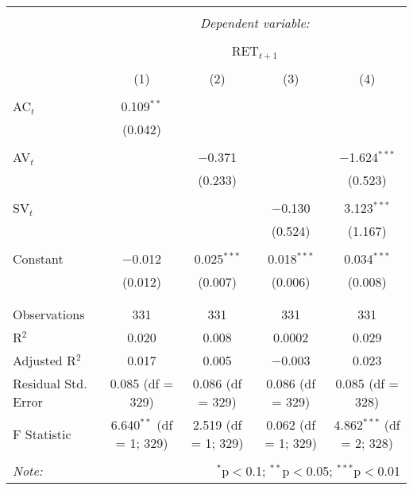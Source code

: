 
\begin{table}[!htbp] \centering 
  \caption{} 
  \label{} 
\begin{tabular}{@{\extracolsep{5pt}}lcccc} 
\\[-1.8ex]\hline 
\hline \\[-1.8ex] 
 & \multicolumn{4}{c}{\textit{Dependent variable:}} \\ 
\cline{2-5} 
\\[-1.8ex] & \multicolumn{4}{c}{RET$_{t+1}$} \\ 
\\[-1.8ex] & (1) & (2) & (3) & (4)\\ 
\hline \\[-1.8ex] 
 AC$_{t}$ & 0.109$^{**}$ &  &  &  \\ 
  & (0.042) &  &  &  \\ 
  & & & & \\ 
 AV$_{t}$ &  & $-$0.371 &  & $-$1.624$^{***}$ \\ 
  &  & (0.233) &  & (0.523) \\ 
  & & & & \\ 
 SV$_{t}$ &  &  & $-$0.130 & 3.123$^{***}$ \\ 
  &  &  & (0.524) & (1.167) \\ 
  & & & & \\ 
 Constant & $-$0.012 & 0.025$^{***}$ & 0.018$^{***}$ & 0.034$^{***}$ \\ 
  & (0.012) & (0.007) & (0.006) & (0.008) \\ 
  & & & & \\ 
\hline \\[-1.8ex] 
Observations & 331 & 331 & 331 & 331 \\ 
R$^{2}$ & 0.020 & 0.008 & 0.0002 & 0.029 \\ 
Adjusted R$^{2}$ & 0.017 & 0.005 & $-$0.003 & 0.023 \\ 
Residual Std. Error & 0.085 (df = 329) & 0.086 (df = 329) & 0.086 (df = 329) & 0.085 (df = 328) \\ 
F Statistic & 6.640$^{**}$ (df = 1; 329) & 2.519 (df = 1; 329) & 0.062 (df = 1; 329) & 4.862$^{***}$ (df = 2; 328) \\ 
\hline 
\hline \\[-1.8ex] 
\textit{Note:}  & \multicolumn{4}{r}{$^{*}$p$<$0.1; $^{**}$p$<$0.05; $^{***}$p$<$0.01} \\ 
\end{tabular} 
\end{table} 
